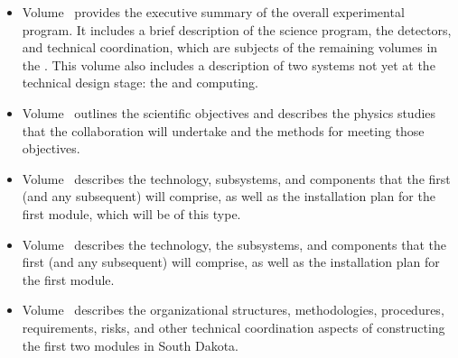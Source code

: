 \begin{itemize}
\item Volume~\volnumberexec{} provides the executive summary of the overall experimental program. It includes a brief description of the  science program, the  detectors, and technical coordination, which are subjects of the remaining volumes in the . This volume also includes a description of two systems not yet at the technical design stage: the   and  computing.
\item Volume~\volnumberphysics{} outlines the scientific objectives and describes the physics studies that the  collaboration will undertake and the methods for meeting those objectives.
\item Volume~\volnumbersp{} describes the   technology, subsystems, and components that the first (and any subsequent)   will comprise, as well as the installation plan for the first  module, which will be of this type. 
\item Volume~\volnumberdp{} describes the   technology, the subsystems, and components that  the first (and any subsequent)   will comprise, as well as the installation plan for the first  module. 
\item Volume~\volnumbertc{} describes the organizational structures,  methodologies, procedures, requirements, risks, and other technical  coordination aspects of constructing the first two  modules in South Dakota.
\end{itemize}

